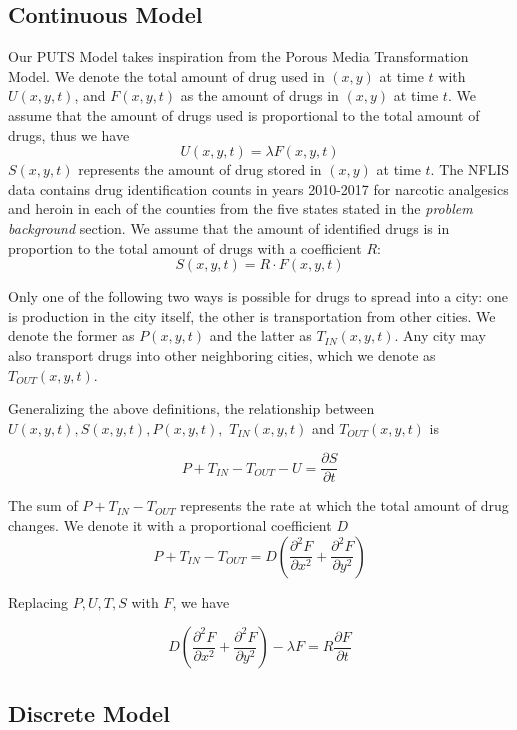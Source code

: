 \subsection{Continuous Model}
Our PUTS Model takes inspiration from the Porous Media Transformation Model.%
We denote the total amount of drug used in $(x,y)$ at time $t$ with $U(x,y,t)$, and $F(x,y,t)$ as the amount of drugs in $(x,y)$ at time $t$. We assume that the amount of drugs used is proportional to the total amount of drugs, thus we have
\begin{equation}
U(x,y,t)=\lambda F(x,y,t)
\end{equation}
$S(x,y,t)$ represents the amount of drug stored in $(x,y)$ at time $t$. The NFLIS data contains drug identification counts in years 2010-2017 for narcotic analgesics and heroin in each of the counties from the five states stated in the \textit{problem background} section. We assume that the amount of identified drugs is in proportion to the total amount of drugs with a coefficient $R$:
\begin{equation}
S(x,y,t) = R\cdot F(x,y,t)
\end{equation}

Only one of the following two ways is possible for drugs to spread into a city: one is production in the city itself, the other is transportation from other cities. We denote the former as $P(x,y,t)$ and the latter as $T_{IN}(x,y,t)$. Any city may also transport drugs into other neighboring cities, which we denote as $T_{OUT}(x,y,t)$.

Generalizing the above definitions, the relationship between $U(x,y,t), S(x,y,t), P(x,y,t),$ $T_{IN}(x,y,t)$ and $T_{OUT}(x,y,t)$ is

\begin{equation}
P+T_{IN}-T_{OUT}-U=\frac{\partial S}{\partial t} 
\end{equation}

The sum of $P+T_{IN}-T_{OUT}$ represents the rate at which the total amount of drug changes. We denote it with a proportional coefficient $D$
\begin{equation}
P+T_{IN}-T_{OUT} =D(\frac{\partial^2 F}{\partial x^2} + \frac{\partial^2 F}{\partial y^2})
\end{equation}

Replacing $P, U, T, S$ with $F$, we have

\begin{equation}
D(\frac{\partial^2 F}{\partial x^2} + \frac{\partial^2 F}{\partial y^2})- \lambda F =
R \frac{\partial F}{\partial t}
\end{equation}

 
\subsection{Discrete Model}